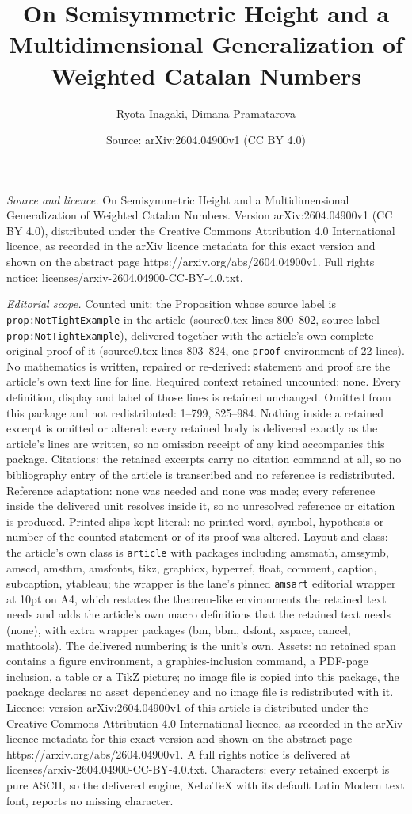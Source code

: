 \documentclass[10pt,a4paper]{amsart}
\title[On Semisymmetric Height and a Multidimensional Generalizatio]{On Semisymmetric Height and a Multidimensional Generalization of Weighted Catalan Numbers}
\author{Ryota Inagaki, Dimana Pramatarova}
\date{Source: arXiv:2604.04900v1 (CC BY 4.0)}
\begin{document}
\maketitle

\noindent\emph{Source and licence.} On Semisymmetric Height and a Multidimensional Generalization of Weighted Catalan Numbers. Version arXiv:2604.04900v1 (CC BY 4.0), distributed under the Creative Commons Attribution 4.0 International licence, as recorded in the arXiv licence metadata for this exact version and shown on the abstract page https://arxiv.org/abs/2604.04900v1. Full rights notice: licenses/arxiv-2604.04900-CC-BY-4.0.txt.\par\smallskip

\noindent\textit{Editorial scope.} Counted unit: the Proposition whose source label is \texttt{prop:NotTightExample} in the article (source0.tex lines 800--802, source label \texttt{prop:NotTightExample}), delivered together with the article's own complete original proof of it (source0.tex lines 803--824, one \texttt{proof} environment of 22 lines). No mathematics is written, repaired or re-derived: statement and proof are the article's own text line for line. Required context retained uncounted: none. Every definition, display and label of those lines is retained unchanged. Omitted from this package and not redistributed: 1--799, 825--984. Nothing inside a retained excerpt is omitted or altered: every retained body is delivered exactly as the article's lines are written, so no omission receipt of any kind accompanies this package. Citations: the retained excerpts carry no citation command at all, so no bibliography entry of the article is transcribed and no reference is redistributed. Reference adaptation: none was needed and none was made; every reference inside the delivered unit resolves inside it, so no unresolved reference or citation is produced. Printed slips kept literal: no printed word, symbol, hypothesis or number of the counted statement or of its proof was altered. Layout and class: the article's own class is \texttt{article} with packages including amsmath, amssymb, amscd, amsthm, amsfonts, tikz, graphicx, hyperref, float, comment, caption, subcaption, ytableau; the wrapper is the lane's pinned \texttt{amsart} editorial wrapper at 10pt on A4, which restates the theorem-like environments the retained text needs and adds the article's own macro definitions that the retained text needs (none), with extra wrapper packages (bm, bbm, dsfont, xspace, cancel, mathtools). The delivered numbering is the unit's own. Assets: no retained span contains a figure environment, a graphics-inclusion command, a PDF-page inclusion, a table or a TikZ picture; no image file is copied into this package, the package declares no asset dependency and no image file is redistributed with it. Licence: version arXiv:2604.04900v1 of this article is distributed under the Creative Commons Attribution 4.0 International licence, as recorded in the arXiv licence metadata for this exact version and shown on the abstract page https://arxiv.org/abs/2604.04900v1. A full rights notice is delivered at licenses/arxiv-2604.04900-CC-BY-4.0.txt. Characters: every retained excerpt is pure ASCII, so the delivered engine, XeLaTeX with its default Latin Modern text font, reports no missing character.
\end{document}
